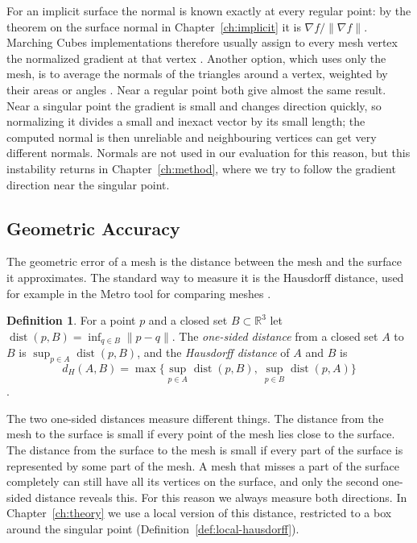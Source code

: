 \documentclass[12pt, a4paper, oneside]{book}
\theoremstyle{plain}
\theoremstyle{definition}
\newtheorem{definition}[theorem]{Definition}
\theoremstyle{remark}
\theoremstyle{definition}
\begin{document}
For an implicit surface the normal is known exactly at every regular point: by the theorem on the surface normal in Chapter~\ref{ch:implicit} it is $\nabla f/\|\nabla f\|$. Marching Cubes implementations therefore usually assign to every mesh vertex the normalized gradient at that vertex \cite{lorensen1998marching,bloomenthal1997introduction}. Another option, which uses only the mesh, is to average the normals of the triangles around a vertex, weighted by their areas or angles \cite{Botsch}. Near a regular point both give almost the same result. Near a singular point the gradient is small and changes direction quickly, so normalizing it divides a small and inexact vector by its small length; the computed normal is then unreliable and neighbouring vertices can get very different normals. Normals are not used in our evaluation for this reason, but this instability returns in Chapter~\ref{ch:method}, where we try to follow the gradient direction near the singular point.

\subsection{Geometric Accuracy}

The geometric error of a mesh is the distance between the mesh and the surface it approximates. The standard way to measure it is the Hausdorff distance, used for example in the Metro tool for comparing meshes \cite{cignoni1998metro}.

\begin{definition}
\label{def:hausdorff}
For a point $p$ and a closed set $B\subset\mathbb{R}^3$ let $\operatorname{dist}(p,B)=\inf_{q\in B}\|p-q\|$. The \emph{one-sided distance} from a closed set $A$ to $B$ is $\sup_{p\in A}\operatorname{dist}(p,B)$, and the \emph{Hausdorff distance} of $A$ and $B$ is
\[
d_H(A,B)=\max\Big\{\sup_{p\in A}\operatorname{dist}(p,B),\ \sup_{p\in B}\operatorname{dist}(p,A)\Big\}
\]
\cite{rockafellar1998variational}.
\end{definition}

The two one-sided distances measure different things. The distance from the mesh to the surface is small if every point of the mesh lies close to the surface. The distance from the surface to the mesh is small if every part of the surface is represented by some part of the mesh. A mesh that misses a part of the surface completely can still have all its vertices on the surface, and only the second one-sided distance reveals this. For this reason we always measure both directions. In Chapter~\ref{ch:theory} we use a local version of this distance, restricted to a box around the singular point (Definition~\ref{def:local-hausdorff}).
\end{document}
